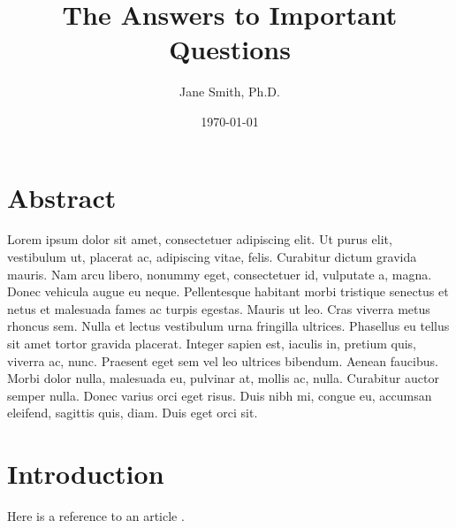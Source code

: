 \documentclass[]{article}
\title{The Answers to Important Questions}
\author{Jane Smith, Ph.D.}
\date{\today}
\begin{document}
\maketitle

\section*{Abstract}

Lorem ipsum dolor sit amet, consectetuer adipiscing elit. Ut purus
elit, vestibulum ut, placerat ac, adipiscing vitae,
felis. Curabitur dictum gravida mauris. Nam arcu libero, nonummy
eget, consectetuer id, vulputate a, magna. Donec vehicula augue eu
neque. Pellentesque habitant morbi tristique senectus et netus et
malesuada fames ac turpis egestas. Mauris ut leo. Cras viverra
metus rhoncus sem. Nulla et lectus vestibulum urna fringilla
ultrices. Phasellus eu tellus sit amet tortor gravida
placerat. Integer sapien est, iaculis in, pretium quis, viverra
ac, nunc. Praesent eget sem vel leo ultrices bibendum. Aenean
faucibus. Morbi dolor nulla, malesuada eu, pulvinar at, mollis ac,
nulla. Curabitur auctor semper nulla. Donec varius orci eget
risus. Duis nibh mi, congue eu, accumsan eleifend, sagittis quis,
diam. Duis eget orci sit.

\section*{Introduction}

\lipsum[1]

Here is a reference to an article \citep{mattar:2005aa}.

\lipsum[2-3]



\end{document}
